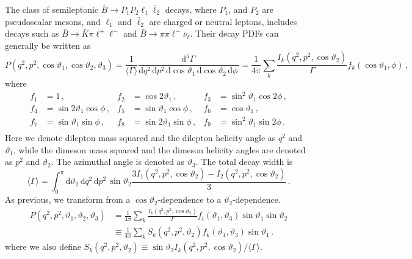 \documentclass[aps,prd,reprint,nofootinbib,preprintnumbers]{revtex4}
\newcommand{\rmdx}[1]{\mbox{d} #1 \,} %
\renewcommand{\theta}{\vartheta}
\begin{document}
The class of semileptonic $\bar{B}\to P_1 P_2 \ell_1\bar\ell_2$ decays, where $P_1$, and $P_2$ are pseudoscalar mesons,
and $\ell_1$ and $\bar\ell_2$ are charged or neutral leptons, includes decays
such as $\bar{B}\to\bar{K}\pi\ell^+\ell^-$ and $\bar{B}\to \pi\pi\ell^-\bar\nu_\ell$.
Their decay PDFs can generally be written as \cite{Lee:1992ih}
\begin{equation}
    P(q^2, p^2, \cos\theta_1, \cos \theta_2, \theta_3) = \frac{1}{\langle \Gamma\rangle}\frac{\rmdx{^5 \Gamma}}{\rmdx{q^2} \rmdx{p^2} \rmdx{\cos\theta_1} \rmdx{\cos\theta_2} \rmdx{\phi}} = \frac{1}{4\pi} \sum_k \frac{I_k(q^2, p^2, \cos\theta_2)}{\Gamma} f_k(\cos\theta_1,\phi)\,,
\end{equation}
where
\begin{equation}
\begin{aligned}
    f_1 & = 1\,,              &
    f_2 & = \cos 2\theta_1\,, &
    f_3 & = \sin^2\theta_1 \cos 2\phi\,,\\
    f_4 & = \sin 2\theta_1 \cos  \phi\,,&
    f_5 & = \sin  \theta_1 \cos  \phi\,,&
    f_6 & = \cos  \theta_1\,, \\
    f_7 & = \sin  \theta_1 \sin  \phi\,,&
    f_8 & = \sin 2\theta_1 \sin  \phi\,,&
    f_9 & = \sin^2\theta_1 \sin 2\phi\,.\\
\end{aligned}
\end{equation}
Here we denote dilepton mass squared and the dilepton helicity angle as $q^2$ and $\theta_1$, while
the dimeson mass squared and the dimeson helicity angles are denoted as $p^2$ and $\theta_2$. The
azimuthal angle is denoted as $\theta_3$.
The total decay width is
\begin{equation}
    \langle \Gamma\rangle = \int_0^\pi \rmdx{\theta_2} \rmdx{q^2} \rmdx{p^2} \sin\theta_2 \frac{3I_1(q^2, p^2, \cos\theta_2) - I_2(q^2, p^2, \cos\theta_2)}{3}\,.
\end{equation}
As previous, we transform from a $\cos\theta_2$-dependence to a $\theta_2$-dependence.
\begin{equation}
\begin{aligned}
    P(q^2, p^2, \theta_1, \theta_2, \theta_3)
    & = \frac{1}{4\pi} \sum_k \frac{I_k(q^2, p^2, \cos\theta_2)}{\Gamma} f_i(\theta_1, \theta_3) \sin\theta_1 \sin\theta_2\\
    & \equiv \frac{1}{4\pi} \sum_k S_k(q^2, p^2, \theta_2) f_k(\theta_1, \theta_3) \sin\theta_1\,.
\end{aligned}
\end{equation}
where we also define $S_k(q^2, p^2, \theta_2) \equiv \sin\theta_2 I_k(q^2, p^2, \cos\theta_2) / \langle \Gamma\rangle$.\\
\end{document}
